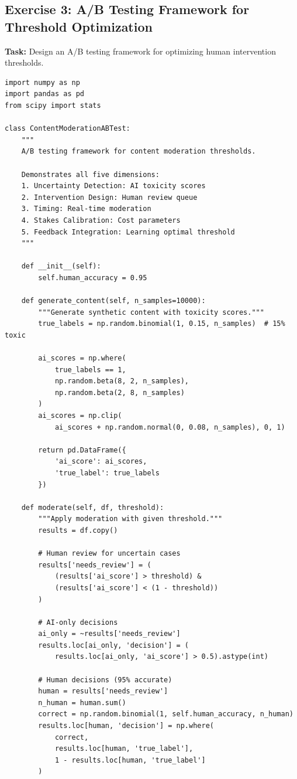 \subsection{Exercise 3: A/B Testing Framework for Threshold Optimization}

\textbf{Task:} Design an A/B testing framework for optimizing human intervention thresholds.

\begin{lstlisting}[style=python, caption={Content moderation A/B testing framework}]
import numpy as np
import pandas as pd
from scipy import stats

class ContentModerationABTest:
    """
    A/B testing framework for content moderation thresholds.

    Demonstrates all five dimensions:
    1. Uncertainty Detection: AI toxicity scores
    2. Intervention Design: Human review queue
    3. Timing: Real-time moderation
    4. Stakes Calibration: Cost parameters
    5. Feedback Integration: Learning optimal threshold
    """

    def __init__(self):
        self.human_accuracy = 0.95

    def generate_content(self, n_samples=10000):
        """Generate synthetic content with toxicity scores."""
        true_labels = np.random.binomial(1, 0.15, n_samples)  # 15% toxic

        ai_scores = np.where(
            true_labels == 1,
            np.random.beta(8, 2, n_samples),
            np.random.beta(2, 8, n_samples)
        )
        ai_scores = np.clip(
            ai_scores + np.random.normal(0, 0.08, n_samples), 0, 1)

        return pd.DataFrame({
            'ai_score': ai_scores,
            'true_label': true_labels
        })

    def moderate(self, df, threshold):
        """Apply moderation with given threshold."""
        results = df.copy()

        # Human review for uncertain cases
        results['needs_review'] = (
            (results['ai_score'] > threshold) &
            (results['ai_score'] < (1 - threshold))
        )

        # AI-only decisions
        ai_only = ~results['needs_review']
        results.loc[ai_only, 'decision'] = (
            results.loc[ai_only, 'ai_score'] > 0.5).astype(int)

        # Human decisions (95% accurate)
        human = results['needs_review']
        n_human = human.sum()
        correct = np.random.binomial(1, self.human_accuracy, n_human)
        results.loc[human, 'decision'] = np.where(
            correct,
            results.loc[human, 'true_label'],
            1 - results.loc[human, 'true_label']
        )


\end{lstlisting}
